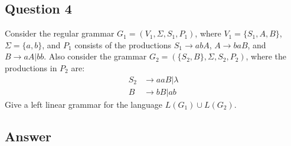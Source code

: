 \newpage

\subsection*{Question 4}

\noindent [10 pts] Consider the regular grammar $G_1 = (V_1, \Sigma, S_1, P_1)$, where $V_1 = \{S_1, A, B\}$,
$\Sigma = \{a, b\}$, and $P_1$ consists of the productions $S_1 \rightarrow abA$, $A \rightarrow baB$, and 
$B \rightarrow aA | bb$. Also consider the grammar $G_2 = (\{S_2, B\}, \Sigma, S_2, P_2)$, where the productions
in $P_2$ are:
\begin{align*}
    S_2 &\rightarrow aaB | \lambda\\
    B &\rightarrow bB | ab
\end{align*}
\noindent Give a left linear grammar for the language $L(G_1) \cup L(G_2)$.

\subsection*{Answer}

